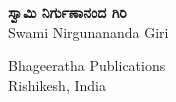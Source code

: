 \begin{titlepage}
\begin{center}
        
		
            
        \vfill
            
        
            
        \vspace{0.1cm}
        {\color{white}    
		\textbf{{\Large \mananamfont ಸ್ವಾಮಿ ನಿರ್ಗುಣಾನಂದ ಗಿರಿ}}\\
		{\normalsize Swami Nirgunananda Giri}
            
        \Large
        Bhageeratha Publications\\
		\normalsize
        Rishikesh, India}\\
    \end{center}
\end{titlepage}
\nopagecolor%